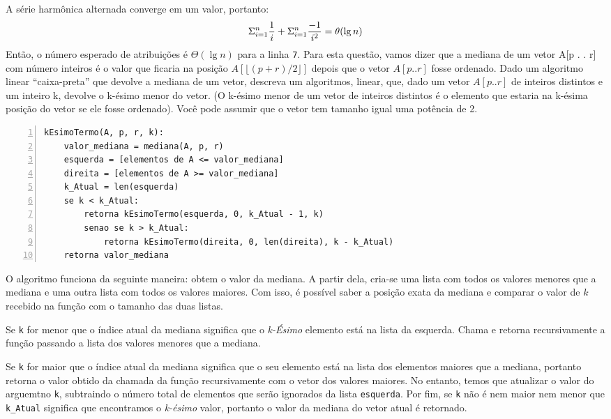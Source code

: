 \documentclass[12pt,a4paper]{article}
\begin{document}
    A série harmônica alternada converge em um valor, portanto:
    \begin{equation}
        \Sigma_{i=1}^n \frac{1}{i} + \Sigma_{i=1}^n \frac{-1}{i^2} = \theta(\lg n)
        \notag
    \end{equation}
    Então, o número esperado de atribuições é $\Theta(\lg n)$ para a linha
\verb|7|.  Para esta questão, vamos dizer que a mediana de um vetor
A[p . . r] com número inteiros é o valor que ficaria na posição $A[\lfloor(p + r)/2\rfloor]$
depois que o vetor $A[p . . r]$ fosse ordenado. Dado um algoritmo linear
“caixa-preta” que devolve a mediana de um vetor, descreva um algoritmos, linear,
que, dado um vetor $A[p . . r]$ de inteiros distintos e um inteiro k, devolve o
k-ésimo menor do vetor. (O k-ésimo menor de um vetor de inteiros distintos é o
elemento que estaria na k-ésima posição do vetor se ele fosse ordenado). Você
pode assumir que o vetor tem tamanho igual uma potência de 2.
\begin{lstlisting}[numbers=left,
    stepnumber=1,]
kEsimoTermo(A, p, r, k):
    valor_mediana = mediana(A, p, r)
    esquerda = [elementos de A <= valor_mediana]
    direita = [elementos de A >= valor_mediana]
    k_Atual = len(esquerda)
    se k < k_Atual:
        retorna kEsimoTermo(esquerda, 0, k_Atual - 1, k)
        senao se k > k_Atual:
            retorna kEsimoTermo(direita, 0, len(direita), k - k_Atual)
    retorna valor_mediana
\end{lstlisting}
O algoritmo funciona da seguinte maneira: obtem o valor da mediana. A partir
dela, cria-se uma lista com todos os valores menores que a mediana e uma outra
lista com todos os valores maiores. Com isso, é possível saber a posição exata
da mediana e comparar o valor de $k$ recebido na função com o tamanho das duas
listas.

Se \verb|k| for menor que o índice atual da mediana significa que o
\emph{k-Ésimo} elemento está na lista da esquerda. Chama e retorna recursivamente a função
passando a lista dos valores menores que a mediana.

Se \verb|k| for maior que o índice atual da mediana significa que o seu elemento está
na lista dos elementos maiores que a mediana, portanto retorna o valor obtido da chamada da função
recursivamente com o vetor dos valores maiores. No entanto, temos que atualizar
o valor do arguemtno \verb|k|, subtraindo o número total de elementos que serão
ignorados da lista \verb|esquerda|. Por fim, se \verb|k| não é nem maior nem menor que \verb|k_Atual| significa que
encontramos o \emph{k-ésimo} valor, portanto o valor da mediana do vetor atual é
retornado.
\end{document}
